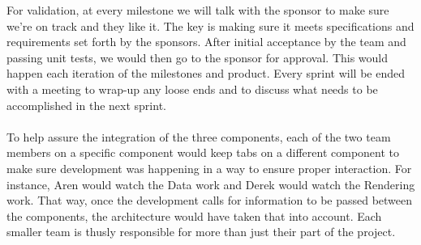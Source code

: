 \documentclass[12pt, letterpaper]{article}
\begin{document}
	For validation, at every milestone we will talk with the sponsor to make
    sure we're on track and they like it. The key is making sure it meets
    specifications and requirements set forth by the sponsors. After initial
    acceptance by the team and passing unit tests, we would then go to the
    sponsor for approval. This would happen each iteration of the milestones and
    product. Every sprint will be ended with a meeting to wrap-up any loose ends
    and to discuss what needs to be accomplished in the next sprint.
	\\\\
	To help assure the integration of the three components, each of the two team
    members on a specific component would keep tabs on a different component to
    make sure development was happening in a way to ensure proper interaction.
    For instance, Aren would watch the Data work and Derek would watch the
    Rendering work. That way, once the development calls for information to be
    passed between the components, the architecture would have taken that into
    account. Each smaller team is thusly responsible for more than just their
    part of the project.\\\\
\end{document}
